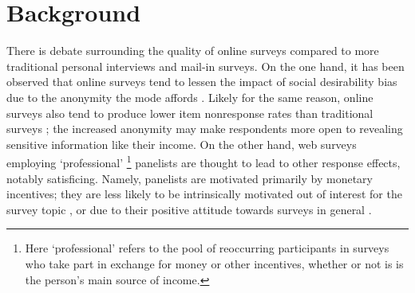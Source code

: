 \documentclass[Royal,times,sageh]{sagej}
\begin{document}
\hypertarget{background}{%
\section{Background}\label{background}}

There is debate surrounding the quality of online surveys compared to
more traditional personal interviews and mail-in surveys. On the one
hand, it has been observed that online surveys tend to lessen the impact
of social desirability bias due to the anonymity the mode affords
\citep{Silber2013, Chang2009, Kreuter2008, deLeeuw2005}. Likely for the
same reason, online surveys also tend to produce lower item nonresponse
rates than traditional surveys \citep{Shin2011}; the increased anonymity
may make respondents more open to revealing sensitive information like
their income. On the other hand, web surveys employing `professional'
\footnote{Here `professional' refers to the pool of reoccurring
  participants in surveys who take part in exchange for money or other
  incentives, whether or not is is the person's main source of income.}
panelists are thought to lead to other response effects, notably
satisficing. Namely, panelists are motivated primarily by monetary
incentives; they are less likely to be intrinsically motivated out of
interest for the survey topic \citep{Silber2013}, or due to their
positive attitude towards surveys in general
\citep{Stocke2004a, Stocke2004c, Dingelstedt2015}.
\end{document}
